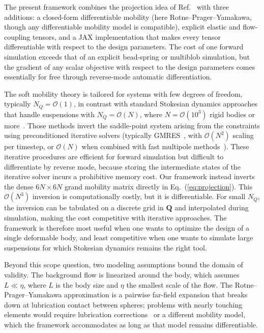 \documentclass[aps,prfluids,groupedaddress]{revtex4-2}
\newcommand{\bQ}{\bm{Q}}
\begin{document}
The present framework combines the projection idea of Ref.~\cite{Solovev2021} with three additions: a closed-form differentiable mobility (here Rotne--Prager--Yamakawa, though any differentiable mobility model is compatible), explicit elastic and flow-coupling tensors, and a JAX implementation that makes every tensor differentiable with respect to the design parameters. The cost of one forward simulation exceeds that of an explicit bead-spring or multiblob simulation, but the gradient of any scalar objective with respect to the design parameters comes essentially for free through reverse-mode automatic differentiation.

The soft mobility theory is tailored for systems with few degrees of freedom, typically $N_Q = \mathcal{O}(1)$, in contrast with standard Stokesian dynamics approaches that handle suspensions with $N_Q = \mathcal{O}(N)$, where $N = \mathcal{O}(10^3)$ rigid bodies or more~\cite{Brady1988,Fiore2019,Swan2016}. Those methods invert the saddle-point system arising from the constraints using preconditioned iterative solvers (typically GMRES~\cite{Saad1986}, with $\mathcal{O}(N^2)$ scaling per timestep, or $\mathcal{O}(N)$ when combined with fast multipole methods~\cite{Greengard1987,Tornberg2008,Liang2013}).
These iterative procedures are efficient for forward simulation but difficult to differentiate by reverse mode, because storing the intermediate states of the iterative solver incurs a prohibitive memory cost. Our framework instead inverts the dense $6N\times 6N$ grand mobility matrix directly in Eq.~(\ref{eq:projection}). This $\mathcal{O}(N^3)$ inversion is computationally costly, but it is differentiable. For small $N_Q$, the inversion can be tabulated on a discrete grid in $\bQ$ and interpolated during simulation, making the cost competitive with iterative approaches. The framework is therefore most useful when one wants to optimize the design of a single deformable body, and least competitive when one wants to simulate large suspensions for which Stokesian dynamics remains the right tool.

Beyond this scope question, two modeling assumptions bound the domain of validity. The background flow is linearized around the body, which assumes $L \ll \eta$, where $L$ is the body size and $\eta$ the smallest scale of the flow. The Rotne--Prager--Yamakawa approximation is a pairwise far-field expansion that breaks down at lubrication contact between spheres; problems with nearly touching elements would require lubrication corrections~\cite{Brady1988,Fiore2019} or a different mobility model, which the framework accommodates as long as that model remains differentiable.
\end{document}
